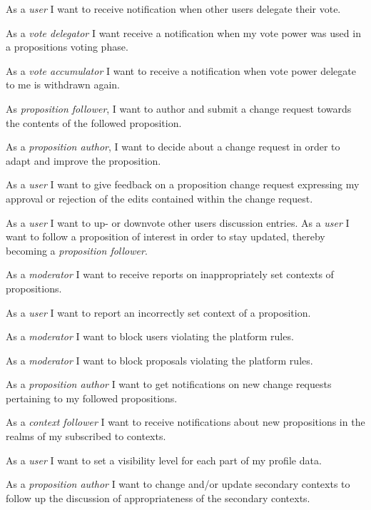  As a \textit{user} I want to receive notification when other users delegate their vote.

 As a \textit{vote delegator} I want receive a notification when my vote power was used in a propositions voting phase.

 As a \textit{vote accumulator} I want to receive a notification when vote power delegate to me is withdrawn again.

 As \textit{proposition follower}, I want to author and submit a change request towards the contents of the followed proposition.

 As a \textit{proposition author}, I want to decide about a change request in order to adapt and improve the proposition.

 As a \textit{user} I want to give feedback on a proposition change request expressing my approval or rejection of the edits contained within the change request.

 As a \textit{user} I want to up- or downvote other users discussion entries.
 As a \textit{user} I want to follow a proposition of interest in order to stay updated, thereby becoming a \textit{proposition follower}.

 As a \textit{moderator} I want to receive reports on inappropriately set contexts of propositions.

 As a \textit{user} I want to report an incorrectly set context of a proposition.

 As a \textit{moderator} I want to block users violating the platform rules.

 As a \textit{moderator} I want to block proposals violating the platform rules.

 As a \textit{proposition author} I want to get notifications on new change requests pertaining to my followed propositions.

 As a \textit{context follower} I want to receive notifications about new propositions in the realms of my subscribed to contexts.

 As a \textit{user} I want to set a visibility level for each part of my profile data.

 As a \textit{proposition author} I want to change and/or update secondary contexts to follow up the discussion of appropriateness of the secondary contexts.

